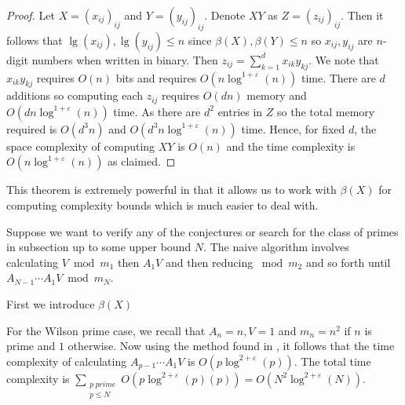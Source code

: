 \begin{proof}

Let $X=(x_{i j})_{i j}$ and $Y=(y_{i j})_{i j}$. Denote $XY$ as $Z=(z_{i j})_{i j}$. Then it follows that  $\lg(x_{ij}),\lg(y_{ij})\leq n$ since $\beta(X),\beta(Y)\leq n$ so $x_{ij}, y_{ij}$ are $n$-digit numbers when written in binary. Then $z_{i j}=\sum_{k=1}^{d} x_{i k} y_{k j}$. We note that $x_{i k} y_{k j}$ requires $O(n)$ bits and requires $O(n\log^{1+\varepsilon}(n))$ time. There are $d$ additions so computing each $z_{i j}$ requires $O(dn)$ memory and $O(dn\log^{1+\varepsilon}(n))$ time. As there are $d^2$ entries in $Z$ so the total memory required is $O(d^3 n)$ and $O(d^3 n \log^{1+\varepsilon}(n))$ time. Hence, for fixed $d$, the space  complexity of computing $XY$ is $O(n)$ and the time complexity is $O(n\log^{1+\varepsilon}(n))$ as claimed.   

\end{proof}

This theorem is extremely powerful in that it allows us to work with $\beta(X)$ for computing complexity bounds which is much easier to deal with.
    
Suppose we want to verify any of the conjectures or search for the class of primes in subsection up to some upper bound $N$. The naive algorithm involves calculating $V \bmod m_1$ then $A_1 V$ and then reducing $\bmod m_2$ and so forth until $A_{N-1}\cdots A_1 V\bmod m_N$. 

First we introduce $\beta(X)$


For the Wilson prime case, we recall that $A_n=n, V=1$ and $m_n=n^2$ if $n$ is prime and $1$ otherwise.
Now using the method found in , it follows that the time complexity of calculating $A_{p-1}\cdots A_{1} V$ is $O(p\log^{2+\varepsilon}(p))$. 
The total time complexity is $\sum_{\substack{p \ prime \\ p \leq N}}O(p\log^{2+\varepsilon}(p)(p))=O(N^2\log^{2+\varepsilon}(N))$.           

     
